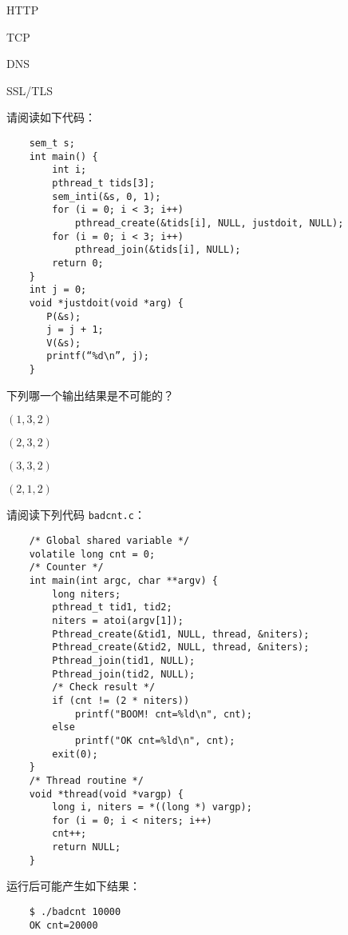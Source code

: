 \begin{problems}
        \begin{choices}
            \item HTTP
            \item TCP
            \item DNS
            \item SSL/TLS
        \end{choices}
         请阅读如下代码：
        \begin{verbatim}
    sem_t s;
    int main() {
        int i;
        pthread_t tids[3];
        sem_inti(&s, 0, 1);
        for (i = 0; i < 3; i++)
            pthread_create(&tids[i], NULL, justdoit, NULL);
        for (i = 0; i < 3; i++)
            pthread_join(&tids[i], NULL);
        return 0;
    }
    int j = 0;
    void *justdoit(void *arg) {
       P(&s);
       j = j + 1;
       V(&s);
       printf(“%d\n”, j);
    }
        \end{verbatim}
        下列哪一个输出结果是不可能的？
        \begin{choices}
            \item $(1, 3, 2)$
            \item $(2, 3, 2)$
            \item $(3, 3, 2)$
            \item $(2, 1, 2)$
        \end{choices}
         请阅读下列代码 \verb|badcnt.c|：
        \begin{verbatim}
    /* Global shared variable */
    volatile long cnt = 0;
    /* Counter */
    int main(int argc, char **argv) {
        long niters;
        pthread_t tid1, tid2;
        niters = atoi(argv[1]);
        Pthread_create(&tid1, NULL, thread, &niters);
        Pthread_create(&tid2, NULL, thread, &niters);
        Pthread_join(tid1, NULL);
        Pthread_join(tid2, NULL);
        /* Check result */
        if (cnt != (2 * niters))
            printf("BOOM! cnt=%ld\n", cnt);
        else
            printf("OK cnt=%ld\n", cnt);
        exit(0);
    }
    /* Thread routine */
    void *thread(void *vargp) {
        long i, niters = *((long *) vargp);
        for (i = 0; i < niters; i++)
        cnt++;
        return NULL;
    }
        \end{verbatim}
        运行后可能产生如下结果：
        \begin{verbatim}
    $ ./badcnt 10000
    OK cnt=20000
        \end{verbatim}

\end{problems}
